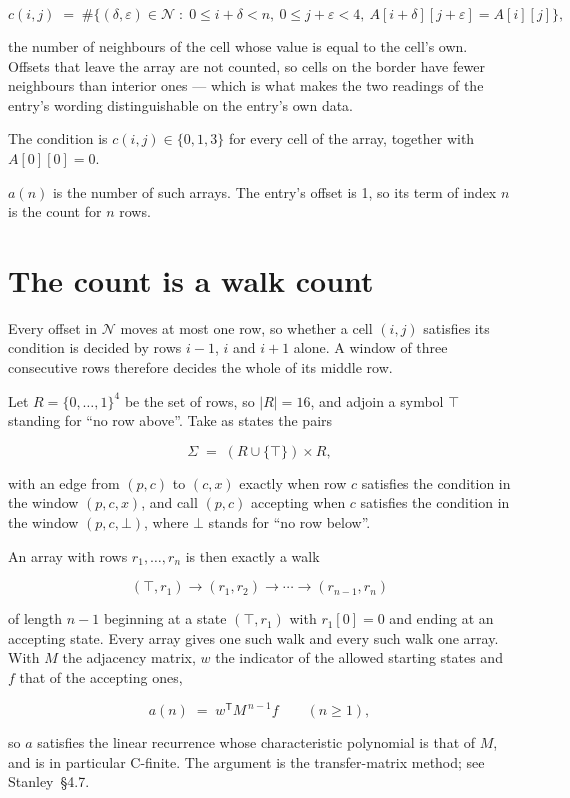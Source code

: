 \documentclass[11pt]{article}
\theoremstyle{definition}
\begin{document}
\[c(i,j) \;=\; \#\bigl\{(\delta,\varepsilon)\in\mathcal{N} \;:\; 0\le i+\delta<n,\ 0\le j+\varepsilon<4,\ A[i+\delta][j+\varepsilon] = A[i][j]\bigr\},\]

the number of neighbours of the cell whose value is equal to the cell's own. Offsets that leave the array are not counted, so cells on the border have fewer neighbours than interior ones --- which is what makes the two readings of the entry's wording distinguishable on the entry's own data.

The condition is $c(i,j) \in \{0, 1, 3\}$ for every cell of the array, together with $A[0][0]=0$.

$a(n)$ is the number of such arrays. The entry's offset is 1, so its term of index $n$ is the count for $n$ rows.

\section{The count is a walk count}

Every offset in $\mathcal{N}$ moves at most one row, so whether a cell $(i,j)$ satisfies its condition is decided by rows $i-1$, $i$ and $i+1$ alone. A window of three consecutive rows therefore decides the whole of its middle row.

Let $R = \{0,\dots,1\}^{4}$ be the set of rows, so $|R| = 16$, and adjoin a symbol $\top$ standing for ``no row above''. Take as states the pairs

\[\Sigma \;=\; (R \cup \{\top\}) \times R,\]

with an edge from $(p,c)$ to $(c,x)$ exactly when row $c$ satisfies the condition in the window $(p,c,x)$, and call $(p,c)$ accepting when $c$ satisfies the condition in the window $(p,c,\bot)$, where $\bot$ stands for ``no row below''.

An array with rows $r_1,\dots,r_n$ is then exactly a walk

\[(\top,r_1) \to (r_1,r_2) \to \cdots \to (r_{n-1},r_n)\]

of length $n-1$ beginning at a state $(\top,r_1)$ with $r_1[0]=0$ and ending at an accepting state. Every array gives one such walk and every such walk one array. With $M$ the adjacency matrix, $w$ the indicator of the allowed starting states and $f$ that of the accepting ones,

\[a(n) \;=\; w^{\mathsf T} M^{\,n-1} f \qquad (n \ge 1),\]

so $a$ satisfies the linear recurrence whose characteristic polynomial is that of $M$, and is in particular C-finite. The argument is the transfer-matrix method; see Stanley~\S4.7.
\end{document}
